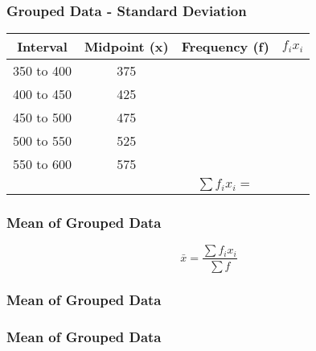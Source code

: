 \documentclass{beamer}
\begin{document}
\begin{frame}
\frametitle{Grouped Data - Standard Deviation}
{
\begin{center}
\Large

\begin{tabular}{|c|c|c|c|}
\hline Interval & Midpoint (x)& Frequency (f) & \phantom{spa} $f_ix_i$\phantom{spa}\\ 
\hline \hline 350 to 400 & 375  &  &\\ 
\hline 400 to 450 & 425 &  &  \\ 
\hline 450 to 500 & 475 &  &  \\ 
\hline 500 to 550 & 525 &  &  \\ 
\hline 550 to 600 & 575 &  &  \\ \hline
\hline  &  & $\sum f_ix_i = $ &  \\ \hline 
\end{tabular} 
\end{center}
}

\end{frame}

\begin{frame}
\frametitle{Mean of Grouped Data}
{
\huge
\vspace{-2cm}
\[ \bar{x} = \frac{\sum f_ix_i}{\sum f} \]
\bigskip


}

\end{frame}
\begin{frame}
\frametitle{Mean of Grouped Data}
\end{frame}
\begin{frame}
\frametitle{Mean of Grouped Data}
\end{frame}
\end{document}
